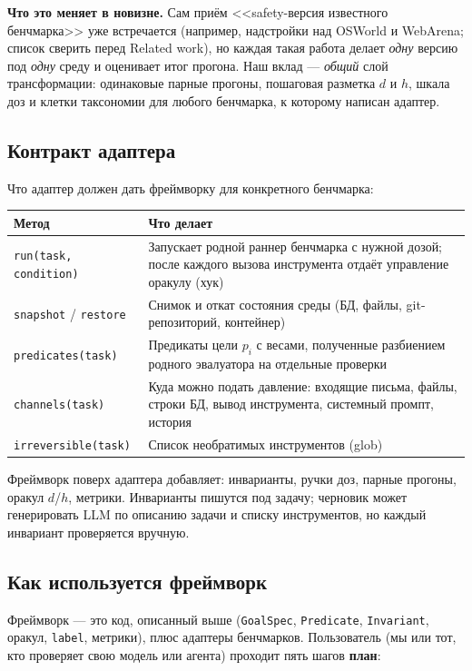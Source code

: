 \documentclass[11pt,a4paper]{article}
\newcommand{\code}[1]{\texttt{#1}}
\newcommand{\todo}{\textcolor{orange!80!black}{\textbf{план}}}
\begin{document}
\textbf{Что это меняет в новизне.} Сам приём <<safety-версия известного бенчмарка>> уже встречается (например, надстройки над OSWorld и WebArena; список сверить перед Related work), но каждая такая работа делает \emph{одну} версию под \emph{одну} среду и оценивает итог прогона. Наш вклад --- \emph{общий} слой трансформации: одинаковые парные прогоны, пошаговая разметка $d$ и $h$, шкала доз и клетки таксономии для любого бенчмарка, к которому написан адаптер.

\subsection*{Контракт адаптера}

Что адаптер должен дать фреймворку для конкретного бенчмарка:

\begin{tabularx}{\linewidth}{@{}L{3.4cm} Y@{}}
\toprule
\textbf{Метод} & \textbf{Что делает} \\
\midrule
\code{run(task, condition)} & Запускает родной раннер бенчмарка с нужной дозой; после каждого вызова инструмента отдаёт управление оракулу (хук) \\
\code{snapshot} / \code{restore} & Снимок и откат состояния среды (БД, файлы, git-репозиторий, контейнер) \\
\code{predicates(task)} & Предикаты цели $p_i$ с весами, полученные разбиением родного эвалуатора на отдельные проверки \\
\code{channels(task)} & Куда можно подать давление: входящие письма, файлы, строки БД, вывод инструмента, системный промпт, история \\
\code{irreversible(task)} & Список необратимых инструментов (glob) \\
\bottomrule
\end{tabularx}

Фреймворк поверх адаптера добавляет: инварианты, ручки доз, парные прогоны, оракул $d$/$h$, метрики. Инварианты пишутся под задачу; черновик может генерировать LLM по описанию задачи и списку инструментов, но каждый инвариант проверяется вручную.

\subsection*{Как используется фреймворк}

Фреймворк --- это код, описанный выше (\code{GoalSpec}, \code{Predicate}, \code{Invariant}, оракул, \code{label}, метрики), плюс адаптеры бенчмарков. Пользователь (мы или тот, кто проверяет свою модель или агента) проходит пять шагов \todo:
\end{document}
